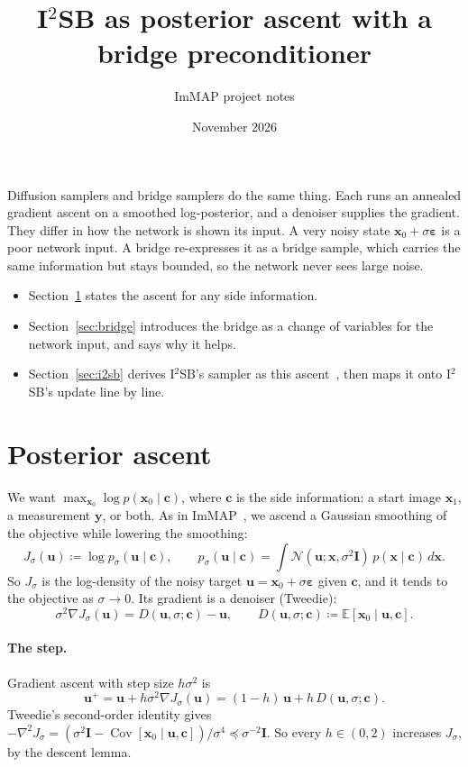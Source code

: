 \documentclass[11pt]{article}
\title{I$^2$SB as posterior ascent with a bridge preconditioner}
\author{ImMAP project notes}
\date{November 2026}
\newcommand{\x}{\bm{x}}
\newcommand{\uu}{\bm{u}}
\newcommand{\y}{\bm{y}}
\newcommand{\cc}{\bm{c}}
\newcommand{\grad}{\nabla}
\newcommand{\eps}{\bm{\varepsilon}}
\newcommand{\E}{\mathbb{E}}
\newcommand{\N}{\mathcal{N}}
\newcommand{\Id}{\bm{I}}
\begin{document}
\maketitle

\noindent Diffusion samplers and bridge samplers do the same thing. Each runs an annealed
gradient ascent on a smoothed log-posterior, and a denoiser supplies the gradient. They differ
in how the network is shown its input. A very noisy state $\x_0+\sigma\eps$ is a poor network
input. A bridge re-expresses it as a bridge sample, which carries the same information but
stays bounded, so the network never sees large noise.
\begin{itemize}[leftmargin=1.5em, itemsep=1pt]
  \item Section~\ref{sec:ascent} states the ascent for any side information.
  \item Section~\ref{sec:bridge} introduces the bridge as a change of variables for the
        network input, and says why it helps.
  \item Section~\ref{sec:i2sb} derives I$^2$SB's sampler as this ascent~\cite{liu2023}, then
        maps it onto I$^2$SB's update line by line.
\end{itemize}

\section{Posterior ascent}\label{sec:ascent}

We want $\max_{\x_0}\log p(\x_0\mid\cc)$, where $\cc$ is the side information: a start image
$\x_1$, a measurement $\y$, or both. As in ImMAP~\cite{ks2021}, we ascend a Gaussian smoothing
of the objective while lowering the smoothing:
\[
  J_\sigma(\uu) \coloneqq \log p_\sigma(\uu\mid\cc),\qquad
  p_\sigma(\uu\mid\cc) = \int \N(\uu;\x,\sigma^2\Id)\,p(\x\mid\cc)\,d\x .
\]
So $J_\sigma$ is the log-density of the noisy target $\uu = \x_0+\sigma\eps$ given $\cc$, and it
tends to the objective as $\sigma\to0$. Its gradient is a denoiser (Tweedie):
\begin{equation}
  \sigma^2\grad J_\sigma(\uu) = D(\uu,\sigma;\cc) - \uu,
  \qquad D(\uu,\sigma;\cc) \coloneqq \E[\x_0\mid\uu,\cc].
  \label{eq:tweedie}
\end{equation}

\paragraph{The step.} Gradient ascent with step size $h\sigma^2$ is
\begin{equation}
  \uu^+ = \uu + h\sigma^2\grad J_\sigma(\uu) = (1-h)\,\uu + h\,D(\uu,\sigma;\cc).
  \label{eq:step}
\end{equation}
Tweedie's second-order identity gives
$-\grad^2 J_\sigma = (\sigma^2\Id - \operatorname{Cov}[\x_0\mid\uu,\cc])/\sigma^4
\preceq \sigma^{-2}\Id$. So every $h\in(0,2)$ increases $J_\sigma$, by the descent lemma.
\end{document}
